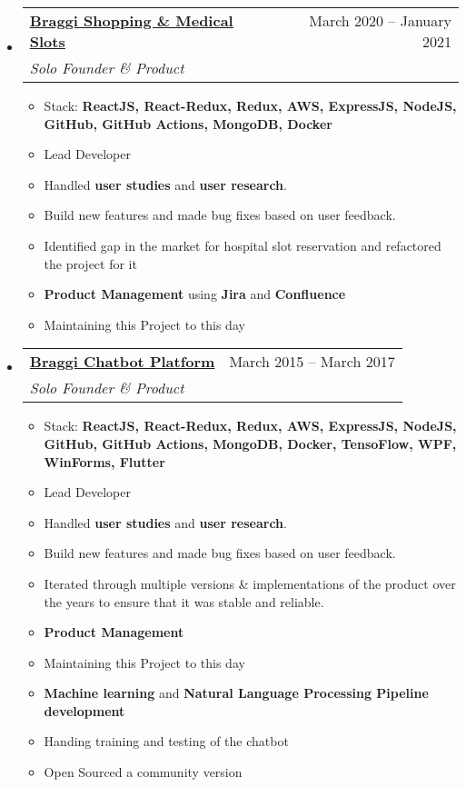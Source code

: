 \documentclass[a4paper,11pt]{article}
\makeatletter
\newcommand{\resumeItem}[1]{
  \item\large{#1}
}
\newcommand{\resumeItemListStart}{\begin{itemize}[rightmargin=0.11in]}
\newcommand{\resumeItemListEnd}{\end{itemize}}
\newcommand{\resumeQuadHeading}[4]{
  \item
  \begin{tabular*}{0.96\textwidth}[t]{l@{\extracolsep{\fill}}r}
    \textbf{#1} & #2 \\
    \textit{\large#3} & \textit{\large #4} \\
  \end{tabular*}
}
\newcommand{\resumeHeadingListStart}{
  \begin{itemize}[leftmargin=0.15in, label={}]
}
\newcommand{\resumeHeadingListEnd}{\end{itemize}}
\makeatother
\begin{document}
  \resumeHeadingListStart{}
  \resumeQuadHeading{\href{https://shoppingslots.in/}{\uline{Braggi Shopping \& Medical Slots
}}}{March 2020 -- January 2021}
  {Solo Founder \& Product}{}
      \resumeItemListStart{}
		\large{During the lockdown, marketing is difficult, and getting work done remotely has been equally difficult, so I started working on a new project. Braggi's Shopping Slots platform took 2 weeks to build, it allows it's users to book a slot to shop at their local grocery store, the platform handles queues and allows shop owners to decide how many people they can accomodate on an hourly basis at their store, while ensuring that social distancing is followed. This was a fun project, because I deployed it much more quickly than anything before, while constantly working with the changing situations due to the pandemic, it's helped me greatly with my ability to understand the market as a whole and it's needs during times like these.}
		\resumeItem{Stack: \textbf{ReactJS,
			React-Redux,
			Redux,
			AWS,
			ExpressJS,
			NodeJS,
			GitHub,
			GitHub Actions,
			MongoDB,
			Docker}}
		\resumeItem{Lead Developer}
		\resumeItem{Handled \textbf{user studies} and \textbf{user research}.}
		\resumeItem{Build new features and made bug fixes based on user feedback.}
		\resumeItem{Identified gap in the market for hospital slot reservation and refactored the project for it}
		\resumeItem{\textbf{Product Management} using \textbf{Jira} and \textbf{Confluence}}
		\resumeItem{Maintaining this Project to this day}
      \resumeItemListEnd{}
  \resumeHeadingListEnd{}

  \resumeHeadingListStart{}
  \resumeQuadHeading{{\uline{Braggi Chatbot Platform
}}}{March 2015 -- March 2017}
  {Solo Founder \& Product}{}
      \resumeItemListStart{}
		\large{Built a production quality chatbot service paired with cross-platform apps build on React and Flutter.}
		\resumeItem{Stack: \textbf{ReactJS,
			React-Redux,
			Redux,
			AWS,
			ExpressJS,
			NodeJS,
			GitHub,
			GitHub Actions,
			MongoDB,
			Docker,
			TensoFlow,
			WPF,
			WinForms,
			Flutter}}
		\resumeItem{Lead Developer}
		\resumeItem{Handled \textbf{user studies} and \textbf{user research}.}
		\resumeItem{Build new features and made bug fixes based on user feedback.}
		\resumeItem{Iterated through multiple versions \& implementations of the product over the years to ensure that it was stable and reliable.}
		\resumeItem{\textbf{Product Management}}
		\resumeItem{Maintaining this Project to this day}
		\resumeItem{\textbf{Machine learning} and \textbf{Natural Language Processing Pipeline development}}
		\resumeItem{Handing training and testing of the chatbot}
		\resumeItem{Open Sourced a community version}
      \resumeItemListEnd{}
  \resumeHeadingListEnd{}
\end{document}
